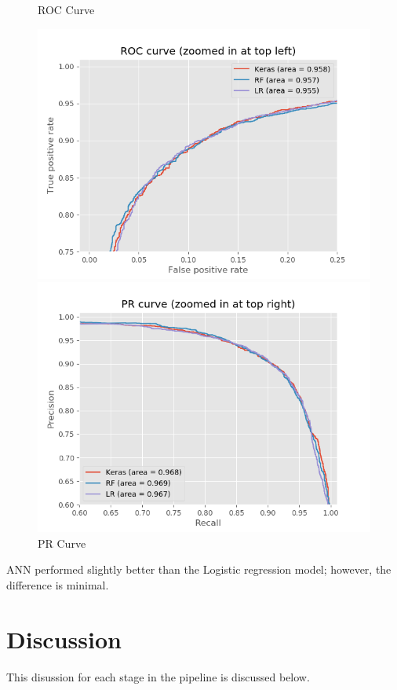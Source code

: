 \documentclass[letterpaper, 12 pt, conference]{ieeeconf}  %
\begin{document}
\begin{figure}[H]
        \caption{ROC Curve}
        \includegraphics[scale=0.55]{../figures/ROC_zoom.png}
        \caption{PR Curve}
        \includegraphics[scale=0.55]{../figures/PR_zoom.png}
\end{figure}

ANN performed slightly better than the Logistic regression model; however, the difference is minimal. 

\section{Discussion}

This disussion for each stage in the pipeline is discussed below.
\end{document}

